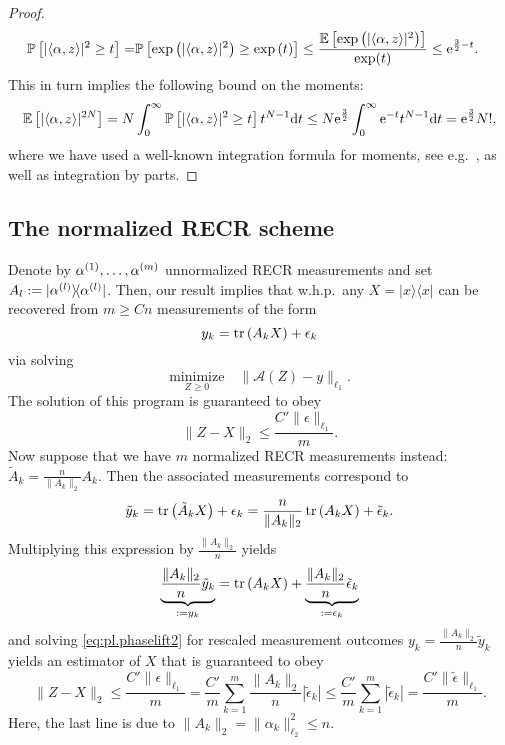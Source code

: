 \begin{proof}
\begin{align}
  \mathbb{P} \left[ | \langle \alpha, z \rangle|^2 \geq t \right]
  =& \mathbb{P} \left[ \exp \left( | \langle  \alpha, z \rangle|^2 \right) \geq \exp \left( t \right) \right]
  \leq \frac{ \mathbb{E} \left[ \exp \left( | \langle \alpha,  z \rangle|^2 \right) \right]}{\exp (t)} \leq \mathrm{e}^{\frac{3}{2}-t}.
\end{align}
This in turn implies the following bound on the moments:
\begin{align}
  \mathbb{E} \left[ | \langle  \alpha, z \rangle|^{2N} \right]
  =  N \int_0^\infty \mathbb{P}\left[ | \langle  \alpha, z \rangle|^2\geq t \right] t^{N-1} \mathrm{d}t \leq N \mathrm{e}^{\frac{3}{2}} \int_0^\infty \mathrm{e}^{-t} t^{N-1} \mathrm{d}t
  = \mathrm{e}^{\frac{3}{2}} N!,
\end{align}
where we have used a well-known integration formula for moments, see e.g.\ \cite[Prop.~7.1]{Foucart_2013_Mathematical}, as well as integration by parts.
\end{proof}


\subsection{The normalized RECR scheme}
\label{sub:pl.normalized_recr}


Denote by $\alpha^{(1)}, \ldots, \alpha^{(m)}$ unnormalized RECR measurements and set $A_l := \ketbra{\alpha\ind{l}}$.
Then, our result implies that w.h.p.\ any $ X = | x \rangle \!\langle  x|$ can be recovered from $m \geq  C n$ measurements of the form
\[
  y_k = \operatorname{tr} \left(  A_k  X \right) + \epsilon_k
\]
via solving
\[
  \underset{ Z\geq 0}{\textrm{minimize}} \quad \| \mathcal{A}( Z) -  y \|_{\ell_1}. \label{eq:pl.phaselift2}
\]
The solution of this program is guaranteed to obey
\[
  \|  Z -  X \|_2 \leq \frac{C' \| \epsilon \|_{\ell_1}}{m}.
\]
Now suppose that we have $m$ normalized RECR measurements instead: $\tilde{ A}_k = \frac{n}{\|  A_k \|_{2}}  A_k$. Then the associated measurements correspond to
\[
  \tilde{y}_k = \operatorname{tr} \left( \tilde{ A}_k X \right) + \epsilon_k = \frac{ n}{\|  A_k \|_2} \operatorname{tr} \left(  A_k X \right) + \tilde{\epsilon}_k.
\]
Multiplying this expression by $\frac{\|  A_k \|_2}{n}$ yields
\[
\underset{:= y_k}{\underbrace{ \frac{ \|  A_k \|_2}{n}\tilde{y}_k}}
= \operatorname{tr} \left(  A_k X \right) + \underset{:= \epsilon_k}{\underbrace{ \frac{ \|  A_k \|_2}{n}\tilde{\epsilon}_k}}
\]
and solving \eqref{eq:pl.phaselift2} for rescaled measurement outcomes $y_k = \frac{ \|  A_k \|_2}{n}\tilde{y}_k$ yields an estimator of $ X$ that is guaranteed to obey
\[
  \|  Z -  X \|_2 \leq \frac{C' \|  \epsilon \|_{\ell_1}}{m}
  = \frac{C'}{m} \sum_{k=1}^m \frac{ \|  A_k \|_2}{n} | \tilde{\epsilon}_k |
  \leq \frac{C'}{m} \sum_{k=1}^m | \tilde{\epsilon}_k| = \frac{C' \| \tilde{\epsilon} \|_{\ell_1}}{m}.
\]
Here, the last line is due to $\|  A_k \|_2 = \| \alpha_k \|_{\ell_2}^2 \leq n$.

